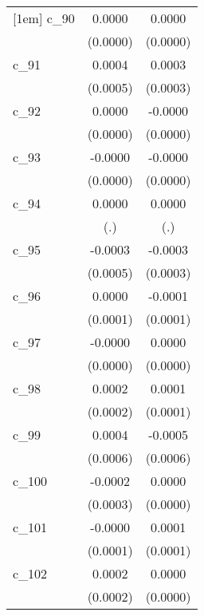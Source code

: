 {\begin{tabular}{l*{2}{c}}
[1em]
c\_90        &      0.0000        &      0.0000        \\
            &    (0.0000)        &    (0.0000)        \\
[1em]
c\_91        &      0.0004        &      0.0003        \\
            &    (0.0005)        &    (0.0003)        \\
[1em]
c\_92        &      0.0000        &     -0.0000        \\
            &    (0.0000)        &    (0.0000)        \\
[1em]
c\_93        &     -0.0000        &     -0.0000        \\
            &    (0.0000)        &    (0.0000)        \\
[1em]
c\_94        &      0.0000        &      0.0000        \\
            &         (.)        &         (.)        \\
[1em]
c\_95        &     -0.0003        &     -0.0003        \\
            &    (0.0005)        &    (0.0003)        \\
[1em]
c\_96        &      0.0000        &     -0.0001        \\
            &    (0.0001)        &    (0.0001)        \\
[1em]
c\_97        &     -0.0000        &      0.0000        \\
            &    (0.0000)        &    (0.0000)        \\
[1em]
c\_98        &      0.0002        &      0.0001        \\
            &    (0.0002)        &    (0.0001)        \\
[1em]
c\_99        &      0.0004        &     -0.0005        \\
            &    (0.0006)        &    (0.0006)        \\
[1em]
c\_100       &     -0.0002        &      0.0000        \\
            &    (0.0003)        &    (0.0000)        \\
[1em]
c\_101       &     -0.0000        &      0.0001        \\
            &    (0.0001)        &    (0.0001)        \\
[1em]
c\_102       &      0.0002        &      0.0000        \\
            &    (0.0002)        &    (0.0000)        \\

\end{tabular}}
